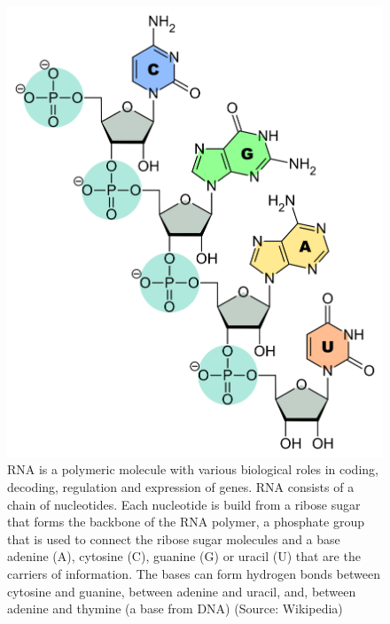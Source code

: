 \documentclass[
  11pt,
]{book}
\begin{document}
\begin{figure}

{\centering \includegraphics[width=0.5\linewidth]{./figs/RNA-Nucleobases} 

}

\caption{RNA is a polymeric molecule with various biological roles in coding, decoding, regulation and expression of genes. RNA consists of a chain of nucleotides. Each nucleotide is build from a ribose sugar that forms the backbone of the RNA  polymer, a phosphate group that is used to connect the ribose sugar molecules and a base adenine (A), cytosine (C), guanine (G) or uracil (U) that are the carriers of information. The bases can form hydrogen bonds between cytosine and guanine, between adenine and uracil, and, between adenine and thymine (a base from DNA) (Source: Wikipedia)}\label{fig:RNA}
\end{figure}
\end{document}
